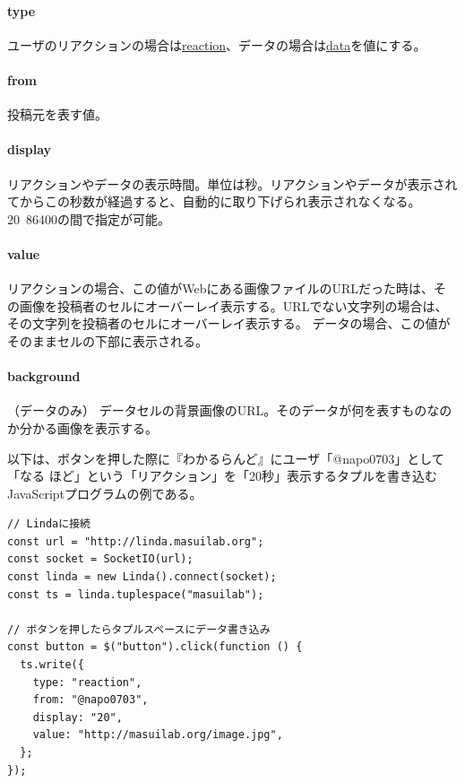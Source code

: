\paragraph*{type}
ユーザのリアクションの場合は\url{reaction}、データの場合は\url{data}を値にする。

\vspace{4mm}
\paragraph*{from}
投稿元を表す値。

\vspace{2mm}
\paragraph*{display}
リアクションやデータの表示時間。単位は秒。リアクションやデータが表示されてからこの秒数が経過すると、自動的に取り下げられ表示されなくなる。20~86400の間で指定が可能。

\vspace{2mm}
\paragraph*{value}
リアクションの場合、この値がWebにある画像ファイルのURLだった時は、その画像を投稿者のセルにオーバーレイ表示する。URLでない文字列の場合は、その文字列を投稿者のセルにオーバーレイ表示する。
データの場合、この値がそのままセルの下部に表示される。

\vspace{4mm}
\paragraph*{background}（データのみ）
データセルの背景画像のURL。そのデータが何を表すものなのか分かる画像を表示する。

\vspace{2mm}
以下は、ボタンを押した際に『わかるらんど』にユーザ「@napo0703」として「なる ほど」という「リアクション」を「20秒」表示するタプルを書き込むJavaScriptプログラムの例である。

\vspace{2mm}
\begin{verbatim}
// Lindaに接続
const url = "http://linda.masuilab.org";
const socket = SocketIO(url);
const linda = new Linda().connect(socket);
const ts = linda.tuplespace("masuilab");

// ボタンを押したらタプルスペースにデータ書き込み
const button = $("button").click(function () {
  ts.write({
    type: "reaction",
    from: "@napo0703",
    display: "20",
    value: "http://masuilab.org/image.jpg",
  };
});
\end{verbatim}
\vspace{2mm}

